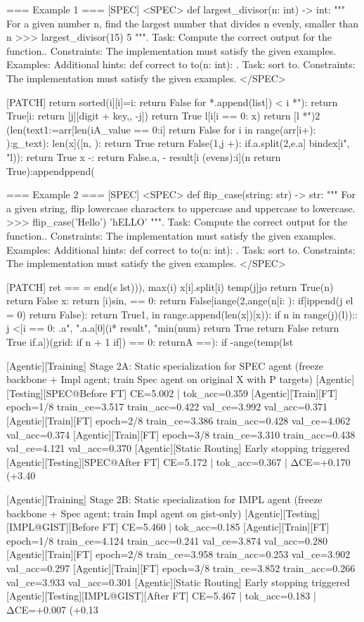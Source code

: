 === Example 1 ===
[SPEC]
<SPEC> def largest_divisor(n: int) -> int: """ For a given number n, find the largest number that divides n evenly, smaller than n >>> largest_divisor(15) 5 """. Task: Compute the correct output for the function.. Constraints: The implementation must satisfy the given examples. Examples: Additional hints: def correct to to(n: int): . Task: sort to. Constraints: The implementation must satisfy the given examples. </SPEC>

[PATCH]
return sorted(i][i]=i: return False for *.append(list]) < i *"): return True[i: return [j][digit + key,, -j]) return True l[i[i == 0: x) return [l *")2 (len(text1:=arr[len(iA_value == 0:i] return False for i in range(arr[i+): ):g_text): len(x]([n, ): return True return False(1,j +): if.a.split(2,e.a] bindex[i", "l)): return True  x -: return False.a, - result[i (evens):i](n return True):appendppend(

=== Example 2 ===
[SPEC]
<SPEC> def flip_case(string: str) -> str: """ For a given string, flip lowercase characters to uppercase and uppercase to lowercase. >>> flip_case('Hello') 'hELLO' """. Task: Compute the correct output for the function.. Constraints: The implementation must satisfy the given examples. Examples: Additional hints: def correct to to(n: int): . Task: sort to. Constraints: The implementation must satisfy the given examples. </SPEC>

[PATCH]
ret == = end(s lst))), max(i) x[i].split[i) temp(j]jo return True(n) return False x: return [i)sin, == 0: return False[iange(2,ange(n[i: ): if[ippend(j el = 0) return False): return True1, in range.append(len(x])[x)): if n in range(j)(l)):: j <[i == 0: .a", ".a.a[0](i* result", "min(num) return True return False return True if.a])(grid: if n + 1 if]) == 0: returnA ==): if -ange(temp(lst

[Agentic][Training] Stage 2A: Static specialization for SPEC agent (freeze backbone + Impl agent; train Spec agent on original X with P targets)
[Agentic][Testing][SPEC@Before FT] CE=5.002 | tok_acc=0.359
[Agentic][Train][FT] epoch=1/8 train_ce=3.517 train_acc=0.422 val_ce=3.992 val_acc=0.371
[Agentic][Train][FT] epoch=2/8 train_ce=3.386 train_acc=0.428 val_ce=4.062 val_acc=0.374
[Agentic][Train][FT] epoch=3/8 train_ce=3.310 train_acc=0.438 val_ce=4.121 val_acc=0.370
[Agentic][Static Routing] Early stopping triggered
[Agentic][Testing][SPEC@After FT] CE=5.172 | tok_acc=0.367 | ΔCE=+0.170 (+3.40%

[Agentic][Training] Stage 2B: Static specialization for IMPL agent (freeze backbone + Spec agent; train Impl agent on gist-only)
[Agentic][Testing][IMPL@GIST][Before FT] CE=5.460 | tok_acc=0.185
[Agentic][Train][FT] epoch=1/8 train_ce=4.124 train_acc=0.241 val_ce=3.874 val_acc=0.280
[Agentic][Train][FT] epoch=2/8 train_ce=3.958 train_acc=0.253 val_ce=3.902 val_acc=0.297
[Agentic][Train][FT] epoch=3/8 train_ce=3.852 train_acc=0.266 val_ce=3.933 val_acc=0.301
[Agentic][Static Routing] Early stopping triggered
[Agentic][Testing][IMPL@GIST][After FT] CE=5.467 | tok_acc=0.183 | ΔCE=+0.007 (+0.13%

